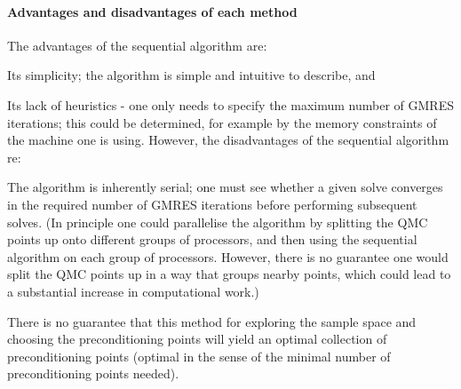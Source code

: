 \paragraph{Advantages and disadvantages of each method} The advantages of the sequential algorithm are:
\bit
\item Its simplicity; the algorithm is simple and intuitive to describe, and
\item Its lack of heuristics - one only needs to specify the maximum number of GMRES iterations; this could be determined, for example by the memory constraints of the machine one is using.
    \eit
    However, the disadvantages of the sequential algorithm re:
    \bit
  \item The algorithm is inherently serial; one must see whether a given solve converges in the required number of GMRES iterations before performing subsequent solves. (In principle one could parallelise the algorithm by splitting the QMC points up onto different groups of processors, and then using the sequential algorithm on each group of processors. However, there is no guarantee one would split the QMC points up in a way that groups nearby points, which could lead to a substantial increase in computational work.)
    \item There is no guarantee that this method for exploring the sample space and choosing the preconditioning points will yield an optimal collection of preconditioning points (optimal in the sense of the minimal number of preconditioning points needed).
    \eit{}


